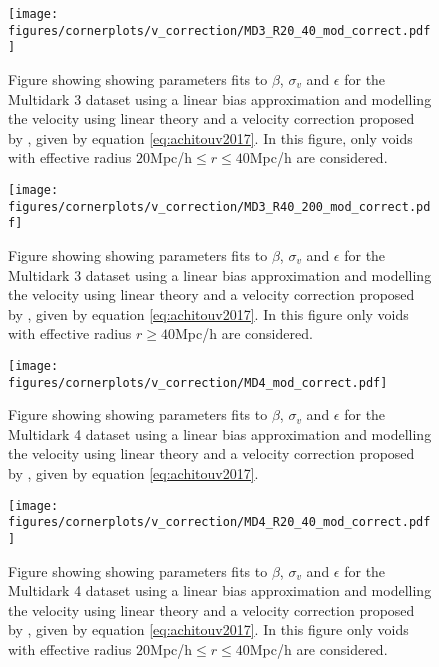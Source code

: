 \begin{figure}[H]
    \texttt{[image: figures/cornerplots/v\_correction/MD3\_R20\_40\_mod\_correct.pdf]}
    \caption{Figure showing showing parameters fits to $\beta$, $\sigma_v$ and $\epsilon$ for the Multidark 3 dataset using a linear bias approximation and modelling the velocity using linear theory and a velocity correction proposed by \cite{Achitouv_streaming}, given by equation \ref{eq:achitouv2017}. In this figure, only voids with effective radius $20$Mpc/h$\leq r \leq 40$Mpc/h are considered.}
    \label{fig:linbiasMD3modR2040}
\end{figure}

\begin{figure}[H]
    \texttt{[image: figures/cornerplots/v\_correction/MD3\_R40\_200\_mod\_correct.pdf]}
    \caption{Figure showing showing parameters fits to $\beta$, $\sigma_v$ and $\epsilon$ for the Multidark 3 dataset using a linear bias approximation and modelling the velocity using linear theory and a velocity correction proposed by \cite{Achitouv_streaming}, given by equation \ref{eq:achitouv2017}. In this figure only voids with effective radius $r \geq 40$Mpc/h are considered.}
    \label{fig:linbiasMD3modR40}
\end{figure}


\begin{figure}[H]
    \texttt{[image: figures/cornerplots/v\_correction/MD4\_mod\_correct.pdf]}
    \caption{Figure showing showing parameters fits to $\beta$, $\sigma_v$ and $\epsilon$ for the Multidark 4 dataset using a linear bias approximation and modelling the velocity using linear theory and a velocity correction proposed by \cite{Achitouv_streaming}, given by equation \ref{eq:achitouv2017}.}
    \label{fig:linbiasMD4mod}
\end{figure}

\begin{figure}[H]
    \texttt{[image: figures/cornerplots/v\_correction/MD4\_R20\_40\_mod\_correct.pdf]}
    \caption{Figure showing showing parameters fits to $\beta$, $\sigma_v$ and $\epsilon$ for the Multidark 4 dataset using a linear bias approximation and modelling the velocity using linear theory and a velocity correction proposed by \cite{Achitouv_streaming}, given by equation \ref{eq:achitouv2017}. In this figure only voids with effective radius $20$Mpc/h$\leq r \leq 40$Mpc/h are considered.}
    \label{fig:linbiasMD4modR2040}
\end{figure}

